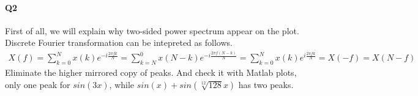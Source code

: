\documentclass[11pt]{article}
\begin{document}
\paragraph{Q2}
First of all, we will explain why two-sided power spectrum appear on the plot. Discrete Fourier transformation can be intepreted as follows.
\begin{align}
	X(f)=\sum_{k=0}^{N}x(k)e^{-i\frac{2\pi fk}{N}}=\sum_{k=N}^{0}x(N-k)e^{-i\frac{2\pi f(N-k)}{N}}=\sum_{k=0}^{N}x(k)e^{i\frac{2\pi fk}{N}}=X(-f)=X(N-f)
\end{align}
Eliminate the higher mirrored copy of peaks. And check it with Matlab plots, only one peak for $sin(3x)$, while $sin(x)+sin(\sqrt[12]{128}x)$ has two peaks.
\begin{figure}[H]
 	\centering
\end{figure}
\end{document}
